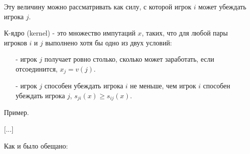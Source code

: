 Эту величину можно рассматривать как силу, с которой игрок $i$ может убеждать игрока $j$. 

\begin{definition}
К-ядро (kernel) - это множество импутаций $x$, таких, что для любой пары игроков $i$ и $j$ выполнено хотя бы одно из двух условий:
\begin{itemize}
\item[-] игрок $j$ получает ровно столько, сколько может заработать, если отсоединится, $x_{j}=v(j)$.
\item[-] игрок $j$ способен убеждать игрока $i$ не меньше, чем игрок $i$ способен убеждать игрока $j$, $s_{ji}(x)\geq s_{ij}(x)$.
\end{itemize}
\end{definition}

Пример.


[...]


Как и было обещано:

